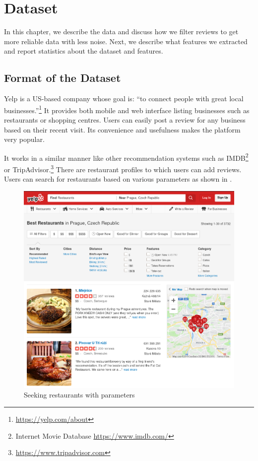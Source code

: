 \chapter{Dataset}\label{chap:dataset}

In this chapter, we describe the data and discuss how we filter reviews to get more reliable data with less noise.
Next, we describe what features we extracted
and report statistics about the dataset and features.

\section{Format of the Dataset}\label{sec:format}

Yelp is a US-based company whose goal is: ``to connect people with great local businesses.''\footnote{\url{https://yelp.com/about}}
It provides both mobile and web interface listing businesses such as restaurants or shopping centres.
Users can easily post a review for any business based on their recent visit.
Its convenience and usefulness makes the platform very popular.

It works in a similar manner like other recommendation systems such as IMDB\footnote{Internet Movie Database \url{https://www.imdb.com/}} or
TripAdvisor.\footnote{\url{https://www.tripadvisor.com}}
There are restaurant profiles to which users can add reviews.
Users can search for restaurants based on various parameters as shown in .

\begin{figure}[ht]\centering
\includegraphics[width=130mm]{../img/filters.png}
\caption{Seeking restaurants with parameters}
\label{fig:filters}
\end{figure}

